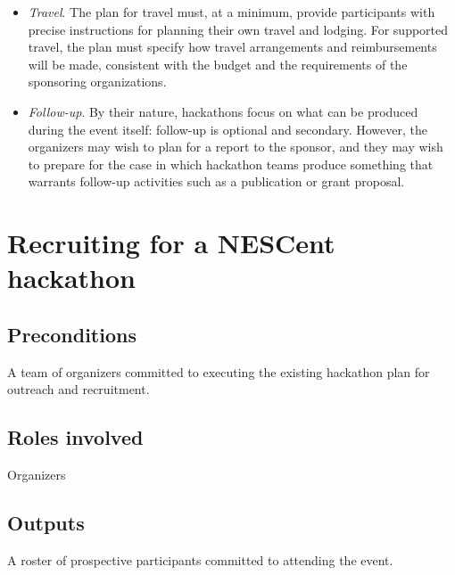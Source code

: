\documentclass[letterpaper,11pt]{texMemo}
\begin{document}
\begin{itemize}
\begin{itemize}
\item	{\em Travel}. The plan for travel must, at a minimum, provide participants with precise instructions for planning their own travel and lodging. For supported travel, the plan must specify how travel arrangements and reimbursements will be made, consistent with the budget and the requirements of the sponsoring organizations.  
\item	{\em Follow-up}. By their nature, hackathons focus on what can be produced during the event itself: follow-up is optional and secondary. However, the organizers may wish to plan for a report to the sponsor, and they may wish to prepare for the case in which hackathon teams produce something that warrants follow-up activities such as a publication or grant proposal.  
\end{itemize}
\end{itemize}

\newpage
\section{Recruiting for a NESCent hackathon}
\subsection{Preconditions}
A team of organizers committed to executing the existing hackathon plan for outreach and recruitment. 
\subsection{Roles involved}
Organizers
\subsection{Outputs}
A roster of prospective participants committed to attending the event. 
\end{document}

